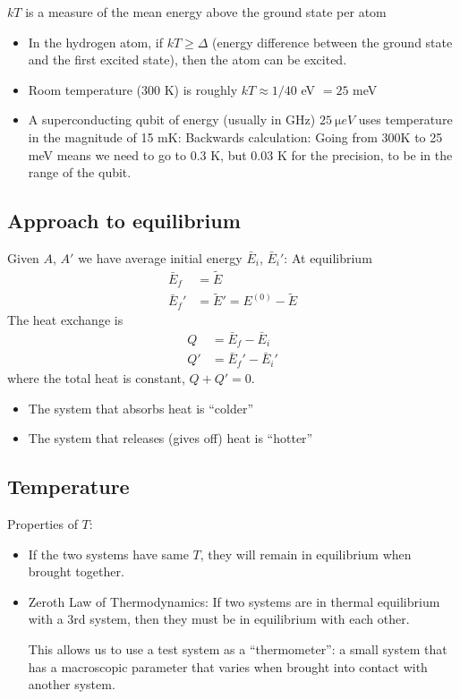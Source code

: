 \documentclass[../main.tex]{subfiles}
\begin{document}
$kT$ is a measure of the mean energy above the ground state per atom

\begin{itemize}
    \item In the hydrogen atom, if $kT \geq \Delta$ (energy difference between the ground state and the first excited state), then the atom can be excited.
    \item Room temperature (300 K) is roughly $kT \approx 1/40$ eV $= 25$ meV
    \item A superconducting qubit of energy (usually in GHz) $\qty{25}{\micro eV}$ uses temperature in the magnitude of 15 mK:
    Backwards calculation: Going from 300K to 25 meV means we need to go to 0.3 K, but 0.03 K for the precision, to be in the range of the qubit.
\end{itemize}

\newpage
\subsection{Approach to equilibrium}

Given $A$, $A'$ we have average initial energy $\bar E_i$, $\bar E_i'$: At equilibrium
\begin{align*}
    \bar E_f &= \tilde E \\
    \bar E_f' &= \tilde E' = E^{(0)} - \tilde E
\end{align*}
The heat exchange is
\begin{align*}
    Q &= \bar E_f - \bar E_i \\
    Q' &= \bar E_f' - \bar E_i'
\end{align*}
where the total heat is constant, $Q + Q' = 0$.

\begin{itemize}
    \item The system that absorbs heat is ``colder''
    \item The system that releases (gives off) heat is ``hotter''
\end{itemize}

\subsection{Temperature}

Properties of $T$:
\begin{itemize}
    \item If the two systems have same $T$, they will remain in equilibrium when brought together.
    \item Zeroth Law of Thermodynamics: 
    If two systems are in thermal equilibrium with a 3rd system, then they must be in equilibrium with each other.

    This allows us to use a test system as a ``thermometer'':
    a small system that has a macroscopic parameter that varies when brought into contact with another system.
\end{itemize}
\end{document}
